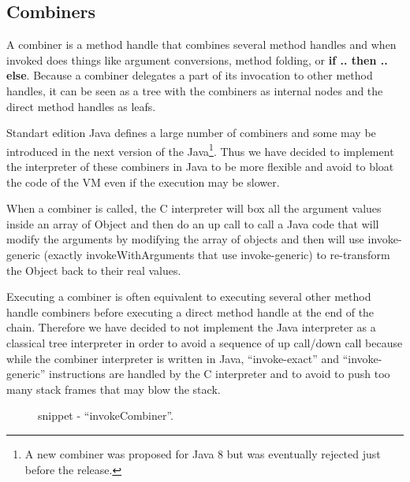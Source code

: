 \documentclass{sig-alternate}
\begin{document}


    \subsection{Combiners}
    \label{combiners}

      A combiner is a method handle that combines several method handles and when invoked
      does things like argument conversions, method folding, or {\bf if .. then .. else}.
      Because a combiner delegates a part of its invocation to other method handles,
      it can be seen as a tree with the combiners as internal nodes and the direct
      method handles as leafs.

      Standart edition Java defines a large number of combiners and some may be introduced in the next version
      of the Java\footnote{A new combiner was proposed for Java 8 but was eventually rejected just before the release.}.
      Thus we have decided to implement the interpreter of these combiners in Java
      to be more flexible and avoid to bloat the code of the VM even if the execution may be slower.
      
      When a combiner is called, the C interpreter will box all the argument values inside an array of Object
      and then do an up call to call a Java code that will modify the arguments by modifying the array
      of objects and then will use invoke-generic (exactly invokeWithArguments that use invoke-generic)
      to re-transform the Object back to their real values.  

      Executing a combiner is often equivalent to executing several other method handle
      combiners before executing a direct method handle at the end of the chain.
      Therefore we have decided to not implement the Java interpreter as a classical
      tree interpreter in order to avoid a sequence of up call/down call because while
      the combiner interpreter is written in Java, ``invoke-exact'' and ``invoke-generic'' instructions
      are handled by the C interpreter and to avoid to push too many stack frames that may blow the stack.
      
      \begin{figure}[!ht]
        \centering \vspace{-1em}
        \caption{snippet - ``invokeCombiner''.}
        \label{implINTERP}
      \end{figure}
\end{document}
